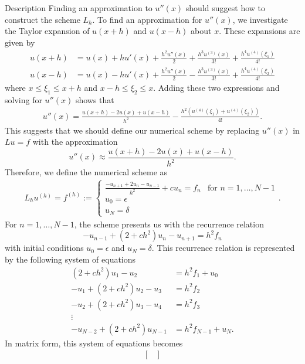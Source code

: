 \begin{subsection}{Description}
  Finding an approximation to $u''(x)$ should suggest how to construct
  the scheme $L_h$.
  To find an approximation for $u''(x)$, we investigate the Taylor expansion
  of $u(x+h)$ and $u(x-h)$ about $x$. These expansions are given by
  \begin{align*}
    u(x + h) &= u(x) + h u'(x) + \frac{h^2 u ''(x)}{2} + \frac{h^3 u^{(3)}(x)}{3!} + \frac{h^4 u^{(4)}(\xi_1)}{4!} \\
    u(x - h) &= u(x) - h u'(x) + \frac{h^2 u ''(x)}{2} - \frac{h^3 u^{(3)}(x)}{3!} + \frac{h^4 u^{(4)}(\xi_2)}{4!}
  \end{align*}
  where $x \leq \xi_1 \leq x + h$ and $x - h \leq \xi_2 \leq x$.
  Adding these two expressions and solving for $u''(x)$ shows that
  \begin{align}\label{second_deriv}
    u''(x) = \frac{u(x + h) - 2u(x) + u(x-h)}{h^2} - \frac{h^2(u^{(4)}(\xi_1) + u^{(4)}(\xi_2))}{4!}.
  \end{align}
  This suggests that we should define our numerical scheme by replacing $u''(x)$
  in $Lu = f$ with the approximation
  \[
  u''(x) \approx \frac{u(x + h) - 2u(x) + u(x-h)}{h^2}.
  \]
  Therefore, we define the numerical scheme as
  \begin{align}\label{numerical_scheme}
    L_h u^{(h)} = f^{(h)} :=
    \begin{cases}
      \frac{-u_{n+1} + 2 u_n - u_{n-1}}{h^2} + c u_n = f_n & \text{for $n= 1, \dots, N - 1$} \\
      u_0 = \epsilon \\
      u_N = \delta
    \end{cases}.
  \end{align}
  For $n=1,\dots,N-1$, the scheme presents us with the recurrence relation
  \[
  -u_{n-1} + (2 + ch^2) u_n - u_{n+1} = h^2 f_n
  \]
  with initial conditions $u_0 = \epsilon$ and $u_N = \delta$. This recurrence
  relation is represented by the following system of equations
  \begin{align*}
    (2 + ch^2) u_1 - u_2 &= h^2f_1 + u_0 \\
    -u_1 + (2 + ch^2) u_2 - u_3 &= h^2f_2 \\
    -u_2 + (2 + ch^2) u_3 - u_4 &= h^2f_3 \\
    \vdots &  \\
    -u_{N-2} + (2 + ch^2) u_{N-1} &= h^2f_{N-1} + u_N.
  \end{align*}
  In matrix form, this system of equations becomes
  \begin{align}\label{matrix_system}
    \begin{bmatrix}

\end{bmatrix}
\end{align}
\end{subsection}

